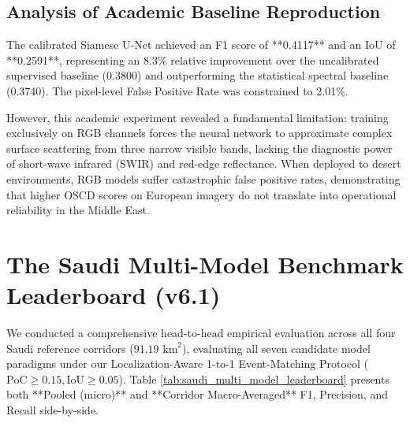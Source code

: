 \subsection{Analysis of Academic Baseline Reproduction}
The calibrated Siamese U-Net achieved an F1 score of **0.4117** and an IoU of **0.2591**, representing an 8.3\% relative improvement over the uncalibrated supervised baseline (0.3800) and outperforming the statistical spectral baseline (0.3740). The pixel-level False Positive Rate was constrained to 2.01\%.

However, this academic experiment revealed a fundamental limitation: training exclusively on RGB channels forces the neural network to approximate complex surface scattering from three narrow visible bands, lacking the diagnostic power of short-wave infrared (SWIR) and red-edge reflectance. When deployed to desert environments, RGB models suffer catastrophic false positive rates, demonstrating that higher OSCD scores on European imagery do not translate into operational reliability in the Middle East.

\section{The Saudi Multi-Model Benchmark Leaderboard (v6.1)}
\label{sec:res_saudi_leaderboard}
We conducted a comprehensive head-to-head empirical evaluation across all four Saudi reference corridors ($91.19\text{ km}^2$), evaluating all seven candidate model paradigms under our Localization-Aware 1-to-1 Event-Matching Protocol ($\text{PoC} \ge 0.15, \text{IoU} \ge 0.05$). Table \ref{tab:saudi_multi_model_leaderboard} presents both **Pooled (micro)** and **Corridor Macro-Averaged** F1, Precision, and Recall side-by-side.

